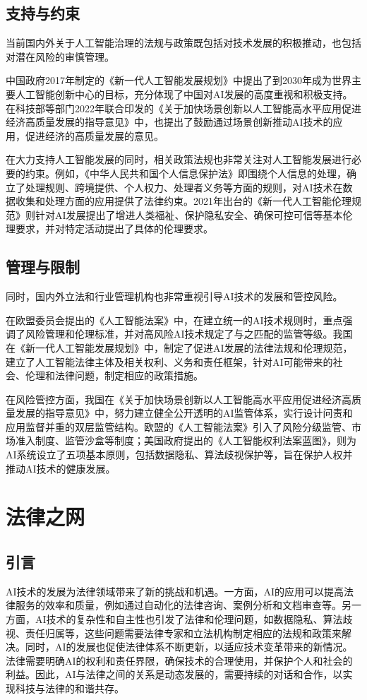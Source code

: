 \subsection{支持与约束}

当前国内外关于人工智能治理的法规与政策既包括对技术发展的积极推动，也包括对潜在风险的审慎管理。

中国政府2017年制定的《新⼀代⼈⼯智能发展规划》中提出了到2030年成为世界主要人工智能创新中心的目标，充分体现了中国对AI发展的高度重视和积极支持。在科技部等部门2022年联合印发的《关于加快场景创新以人工智能高水平应用促进经济高质量发展的指导意见》中，也提出了鼓励通过场景创新推动AI技术的应用，促进经济的高质量发展的意见。

在大力支持人工智能发展的同时，相关政策法规也非常关注对人工智能发展进行必要的约束。例如，《中华人民共和国个人信息保护法》即围绕个人信息的处理，确立了处理规则、跨境提供、个人权力、处理者义务等方面的规则，对AI技术在数据收集和处理方面的应用提供了法律约束。2021年出台的《新一代人工智能伦理规范》则针对AI发展提出了增进人类福祉、保护隐私安全、确保可控可信等基本伦理要求，并对特定活动提出了具体的伦理要求。

\subsection{管理与限制}
同时，国内外立法和行业管理机构也非常重视引导AI技术的发展和管控风险。

在欧盟委员会提出的《人工智能法案》中，在建立统一的AI技术规则时，重点强调了风险管理和伦理标准，并对高风险AI技术规定了与之匹配的监管等级。我国在《新⼀代⼈⼯智能发展规划》中，制定了促进AI发展的法律法规和伦理规范，建立了人工智能法律主体及相关权利、义务和责任框架，针对AI可能带来的社会、伦理和法律问题，制定相应的政策措施。

在风险管控方面，我国在《关于加快场景创新以人工智能高水平应用促进经济高质量发展的指导意见》中，努力建立健全公开透明的AI监管体系，实行设计问责和应用监督并重的双层监管结构。欧盟的《人工智能法案》引入了风险分级监管、市场准入制度、监管沙盒等制度；美国政府提出的《人工智能权利法案蓝图》，则为AI系统设立了五项基本原则，包括数据隐私、算法歧视保护等，旨在保护人权并推动AI技术的健康发展。

\section{法律之网}

\subsection{引言}
AI技术的发展为法律领域带来了新的挑战和机遇。一方面，AI的应用可以提高法律服务的效率和质量，例如通过自动化的法律咨询、案例分析和文档审查等。另一方面，AI技术的复杂性和自主性也引发了法律和伦理问题，如数据隐私、算法歧视、责任归属等，这些问题需要法律专家和立法机构制定相应的法规和政策来解决。同时，AI的发展也促使法律体系不断更新，以适应技术变革带来的新情况。法律需要明确AI的权利和责任界限，确保技术的合理使用，并保护个人和社会的利益。因此，AI与法律之间的关系是动态发展的，需要持续的对话和合作，以实现科技与法律的和谐共存。

